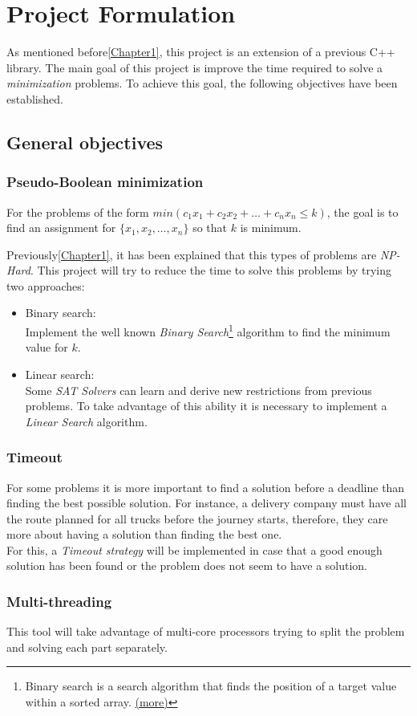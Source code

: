 \chapter{Project Formulation} %

\label{Chapter2} %

As mentioned before\ref{Chapter1}, this project is an extension of a previous C++ library. The main goal of this project is improve the time required to solve a \emph{minimization} problems. To achieve this goal, the following objectives have been established. 

\section{General objectives}

\subsection{Pseudo-Boolean minimization}
For the problems of the form $min(c_{1}x_{1}+c_{2}x_{2}+\ldots +c_{n}x_{n} \leq k)$, the goal is to find an assignment for $\{x_{1},x_{2},\ldots,x_{n}\}$ so that $k$ is minimum.

Previously\ref{Chapter1}, it has been explained that this types of problems are \emph{NP-Hard}. This project will try to reduce the time to solve this problems by trying two approaches:
\begin{itemize}
	\item Binary search:\\
		Implement the well known \emph{Binary Search}\footnote{Binary search is a search algorithm that finds the position of a target value within a sorted array. \href{https://en.wikipedia.org/wiki/Binary_search_algorithm}{(more)}} algorithm to find the minimum value for $k$.
	\item Linear search:\\
		Some \emph{SAT Solvers} can learn and derive new restrictions from previous problems. To take advantage of this ability it is necessary to implement a \emph{Linear Search} algorithm.
\end{itemize}

\subsection{Timeout}
For some problems it is more important to find a solution before a deadline than finding the best possible solution. For instance, a delivery company must have all the route planned for all trucks before the journey starts, therefore, they care more about having a solution than finding the best one.\\
For this, a \emph{Timeout strategy} will be implemented in case that a good enough solution has been found or the problem does not seem to have a solution. 
\subsection{Multi-threading}
This tool will take advantage of multi-core processors trying to split the problem and solving each part separately.
